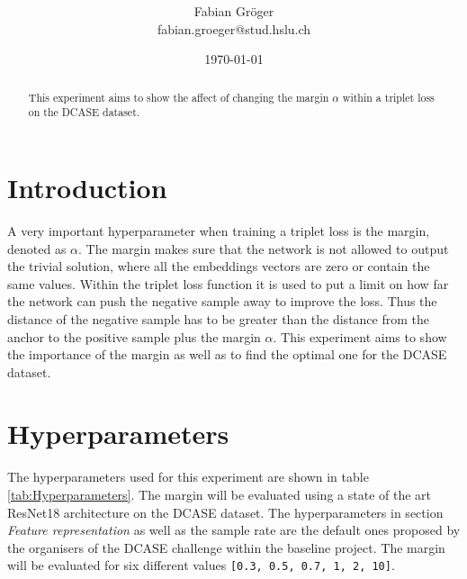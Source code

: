 \documentclass[twocolumn]{article}
\title{\spacecaps{Study doc: margin experiment}\\ \normalsize \spacesc{how does the margin affect the embedding space}}
\author{Fabian Gröger\\fabian.groeger@stud.hslu.ch}
\date{\today}
\begin{document}
\maketitle

\begin{abstract}
This experiment aims to show the affect of changing the margin $\alpha$ within a triplet loss on the DCASE dataset.
\end{abstract}


\section{Introduction}
A very important hyperparameter when training a triplet loss is the margin, denoted as $\alpha$. The margin makes sure that the network is not allowed to output the trivial solution, where all the embeddings vectors are zero or contain the same values. Within the triplet loss function it is used to put a limit on how far the network can push the negative sample away to improve the loss. Thus the distance of the negative sample has to be greater than the distance from the anchor to the positive sample plus the margin $\alpha$. This experiment aims to show the importance of the margin as well as to find the optimal one for the DCASE dataset.

\section{Hyperparameters}
%
The hyperparameters used for this experiment are shown in table \ref{tab:Hyperparameters}. The margin will be evaluated using a state of the art ResNet18 architecture on the DCASE dataset. The hyperparameters in section \textit{Feature representation} as well as the sample rate are the default ones proposed by the organisers of the DCASE challenge within the baseline project. The margin will be evaluated for six different values \texttt{[0.3, 0.5, 0.7, 1, 2, 10]}.
\end{document}
